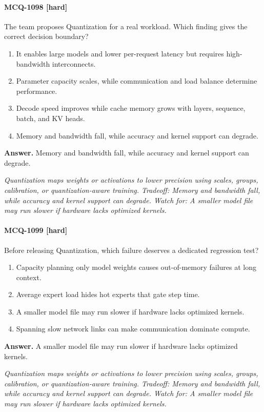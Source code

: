 \paragraph{MCQ-1098 [hard]} The team proposes Quantization for a real workload. Which finding gives the correct decision boundary?
\begin{enumerate}[label=\Alph*.]
\item It enables large models and lower per-request latency but requires high-bandwidth interconnects.
\item Parameter capacity scales, while communication and load balance determine performance.
\item Decode speed improves while cache memory grows with layers, sequence, batch, and KV heads.
\item Memory and bandwidth fall, while accuracy and kernel support can degrade.
\end{enumerate}
\noindent\textbf{Answer.} Memory and bandwidth fall, while accuracy and kernel support can degrade.
\par\textit{Quantization maps weights or activations to lower precision using scales, groups, calibration, or quantization-aware training. Tradeoff: Memory and bandwidth fall, while accuracy and kernel support can degrade. Watch for: A smaller model file may run slower if hardware lacks optimized kernels.}
\paragraph{MCQ-1099 [hard]} Before releasing Quantization, which failure deserves a dedicated regression test?
\begin{enumerate}[label=\Alph*.]
\item Capacity planning only model weights causes out-of-memory failures at long context.
\item Average expert load hides hot experts that gate step time.
\item A smaller model file may run slower if hardware lacks optimized kernels.
\item Spanning slow network links can make communication dominate compute.
\end{enumerate}
\noindent\textbf{Answer.} A smaller model file may run slower if hardware lacks optimized kernels.
\par\textit{Quantization maps weights or activations to lower precision using scales, groups, calibration, or quantization-aware training. Tradeoff: Memory and bandwidth fall, while accuracy and kernel support can degrade. Watch for: A smaller model file may run slower if hardware lacks optimized kernels.}
